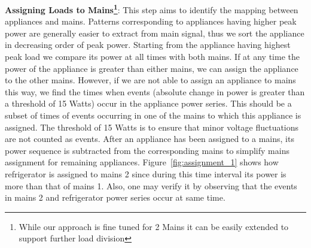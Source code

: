 \documentclass[conference]{IEEEtran}
\newcommand{\figref}[1]{Figure~\ref{#1}}
\begin{document}
\noindent\textbf{Assigning Loads to Mains\footnote{While our approach is fine tuned for 2 Mains it can be easily extended to support further load division}}:
This step aims to identify the mapping between appliances and mains. Patterns corresponding to appliances having higher peak power are generally easier to extract from main signal, thus we sort the appliance in decreasing order of peak power. Starting from the appliance having highest peak load we compare its power at all times with both mains. If at any time the power of the appliance is greater than either mains, we can assign the appliance to the other mains. However, if we are not able to assign an appliance to mains this way, we find the times when events (absolute change in power is greater than a threshold of 15 Watts) occur in the appliance power series. This should be a subset of times of events occurring in one of the mains to which this appliance is assigned. The threshold of 15 Watts is to ensure that minor voltage fluctuations are not counted as events. After an appliance has been assigned to a mains, its power sequence is subtracted from the corresponding mains to simplify mains assignment for remaining appliances. \figref{fig:assignment_1} shows how refrigerator is assigned to mains 2 since during this time interval its power is more than that of mains 1. Also, one may verify it by observing that the events in mains 2 and refrigerator power series occur at same time.
\end{document}
